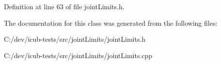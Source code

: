 Definition at line 63 of file joint\+Limits.\+h.



The documentation for this class was generated from the following files\+:\begin{DoxyCompactItemize}
\item 
C\+:/dev/icub-\/tests/src/joint\+Limits/joint\+Limits.\+h\item 
C\+:/dev/icub-\/tests/src/joint\+Limits/joint\+Limits.\+cpp\end{DoxyCompactItemize}
